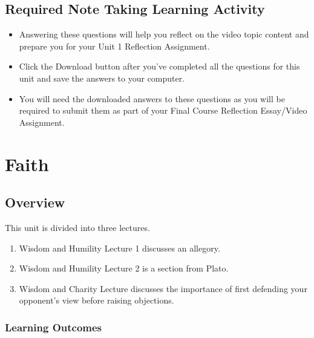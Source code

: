 \documentclass[
]{book}
\providecommand{\tightlist}{%
  \setlength{\itemsep}{0pt}\setlength{\parskip}{0pt}}
\begin{document}
\hypertarget{required-note-taking-learning-activity}{%
\section*{Required Note Taking Learning Activity}\label{required-note-taking-learning-activity}}

\begin{reflect}
\begin{itemize}
\tightlist
\item
  Answering these questions will help you reflect on the video topic content and prepare you for your Unit 1 Reflection Assignment.
\item
  Click the Download button after you've completed all the questions for this unit and save the answers to your computer.
\item
  You will need the downloaded answers to these questions as you will be required to submit them as part of your Final Course Reflection Essay/Video Assignment.
\end{itemize}
\end{reflect}

\hypertarget{faith}{%
\chapter{Faith}\label{faith}}

\hypertarget{overview-1}{%
\section*{Overview}\label{overview-1}}

This unit is divided into three lectures.

\begin{enumerate}
\def\labelenumi{\arabic{enumi}.}
\tightlist
\item
  Wisdom and Humility Lecture 1 discusses an allegory.
\item
  Wisdom and Humility Lecture 2 is a section from Plato.
\item
  Wisdom and Charity Lecture discusses the importance of first defending your opponent's view before raising objections.
\end{enumerate}

\hypertarget{learning-outcomes-1}{%
\subsection*{Learning Outcomes}\label{learning-outcomes-1}}
\end{document}
